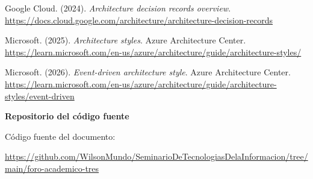 \documentclass[12pt,letterpaper]{article}
\newcommand{\seccion}[1]{%
  \vspace{4pt}%
  {\noindent\textbf{#1}\par}%
  \vspace{1pt}%
}
\newcommand{\referencia}[1]{%
  \par\hangindent=1.27cm\hangafter=1 #1\par
}
\begin{document}
\referencia{Google Cloud. (2024). \textit{Architecture decision records overview}. \url{https://docs.cloud.google.com/architecture/architecture-decision-records}}

\referencia{Microsoft. (2025). \textit{Architecture styles}. Azure Architecture Center. \url{https://learn.microsoft.com/en-us/azure/architecture/guide/architecture-styles/}}

\referencia{Microsoft. (2026). \textit{Event-driven architecture style}. Azure Architecture Center. \url{https://learn.microsoft.com/en-us/azure/architecture/guide/architecture-styles/event-driven}}

\seccion{Repositorio del código fuente}
Código fuente del documento:\par
\url{https://github.com/WilsonMundo/SeminarioDeTecnologiasDelaInformacion/tree/main/foro-academico-tres}
\end{document}
